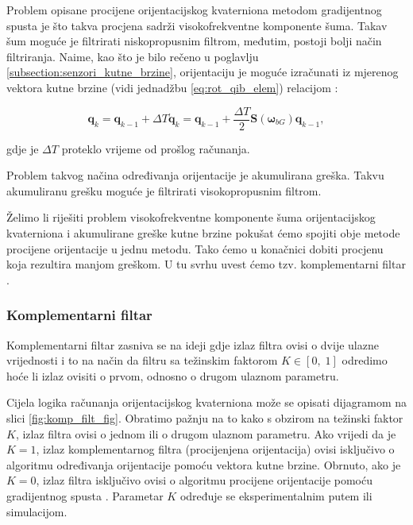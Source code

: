 \documentclass[times, utf8, diplomski, numeric]{templates/template}
\begin{document}
{{{{                Problem opisane procijene orijentacijskog kvaterniona metodom gradijentnog spusta je što takva procjena sadrži visokofrekventne komponente šuma. Takav šum moguće je filtrirati niskopropusnim filtrom, međutim, postoji bolji način filtriranja. Naime, kao što je bilo rečeno u poglavlju \ref{subsection:senzori_kutne_brzine}, orijentaciju je moguće izračunati iz mjerenog vektora kutne brzine (vidi jednadžbu \ref{eq:rot_qib_elem}) relacijom \cite{uvod_u_svemirske}:

                \begin{equation}
                    \boldsymbol{q}_k = \boldsymbol{q}_{k-1} + \Delta T \dot{\boldsymbol{q}}_k = \boldsymbol{q}_{k-1} + \frac{\Delta T}{2} \boldsymbol{S}(\boldsymbol{\omega}_{bG}) \boldsymbol{q}_{k-1},
                \end{equation}

                gdje je $\Delta T$ proteklo vrijeme od prošlog računanja.

                Problem takvog načina određivanja orijentacije je akumulirana greška. Takvu akumuliranu grešku moguće je filtrirati visokopropusnim filtrom. 

                Želimo li riješiti problem visokofrekventne komponente šuma orijentacijskog kvaterniona i akumulirane greške kutne brzine pokušat ćemo spojiti obje metode procijene orijentacije u jednu metodu. Tako ćemo u konačnici dobiti procjenu koja rezultira manjom greškom. U tu svrhu uvest ćemo tzv. komplementarni filtar \cite{uvod_u_svemirske}.
            }

            \subsubsection{Komplementarni filtar}{
                Komplementarni filtar zasniva se na ideji gdje izlaz filtra ovisi o dvije ulazne vrijednosti i to na način da filtru sa težinskim faktorom $K \in \left[ 0, \; 1\right]$ odredimo hoće li izlaz ovisiti o prvom, odnosno o drugom ulaznom parametru. 

                Cijela logika računanja orijentacijskog kvaterniona može se opisati dijagramom na slici \ref{fig:komp_filt_fig}. Obratimo pažnju na to kako s obzirom na težinski faktor $K$, izlaz filtra ovisi o jednom ili o drugom ulaznom parametru. Ako vrijedi da je $K = 1$, izlaz komplementarnog filtra (procijenjena orijentacija) ovisi isključivo o algoritmu određivanja orijentacije pomoću vektora kutne brzine. Obrnuto, ako je $K = 0$, izlaz filtra isključivo ovisi o algoritmu procijene orijentacije pomoću gradijentnog spusta \cite{grad_desc}. Parametar $K$ određuje se eksperimentalnim putem ili simulacijom.

}}}}
\end{document}
